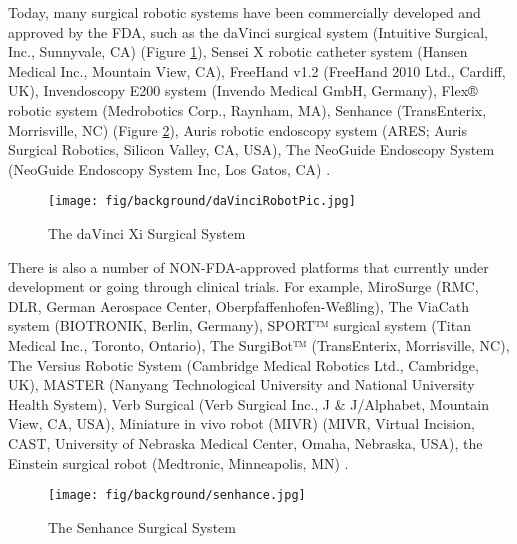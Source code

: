 Today, many surgical robotic systems have been commercially developed and approved by the FDA, such as the daVinci surgical system (Intuitive Surgical, Inc., Sunnyvale, CA) (Figure \ref{fig:daVinci}), Sensei X robotic catheter system (Hansen Medical Inc., Mountain View, CA), FreeHand v1.2 (FreeHand 2010 Ltd., Cardiff, UK), Invendoscopy E200 system (Invendo Medical GmbH, Germany), Flex® robotic system (Medrobotics Corp., Raynham, MA), Senhance (TransEnterix, Morrisville, NC) (Figure \ref{fig:Senhance}), Auris robotic endoscopy system (ARES; Auris Surgical Robotics, Silicon Valley, CA, USA), The NeoGuide Endoscopy System (NeoGuide Endoscopy System Inc, Los Gatos, CA) \cite{lanfranco_robotic_2004,peters_review_2018}.

\begin{figure}[h]
	\begin{center}
	\texttt{[image: fig/background/daVinciRobotPic.jpg]}
	\end{center}
	\vspace{-4mm}
	\caption[The daVinci Xi Surgical System]
	{The daVinci Xi Surgical System}
	\label{fig:daVinci}
	\vspace{-2mm}
\end{figure}

There is also a number of NON-FDA-approved platforms that currently under development or going through clinical trials. For example, MiroSurge (RMC, DLR, German Aerospace Center, Oberpfaffenhofen-Weßling), The ViaCath system (BIOTRONIK, Berlin, Germany), SPORT™ surgical system (Titan Medical Inc., Toronto, Ontario), The SurgiBot™ (TransEnterix, Morrisville, NC), The Versius Robotic System (Cambridge Medical Robotics Ltd., Cambridge, UK), MASTER (Nanyang Technological University and National University Health System), Verb Surgical (Verb Surgical Inc., J \& J/Alphabet, Mountain View, CA, USA), Miniature in vivo robot (MIVR) (MIVR, Virtual Incision, CAST, University of Nebraska Medical Center, Omaha, Nebraska, USA), the Einstein surgical robot (Medtronic, Minneapolis, MN) \cite{peters_review_2018}.

\begin{figure}[h]
	\begin{center}
	\texttt{[image: fig/background/senhance.jpg]}
	\end{center}
	\vspace{-4mm}
	\caption[The Senhance Surgical System]
	{The Senhance Surgical System}
	\label{fig:Senhance}
	\vspace{-2mm}
\end{figure}

